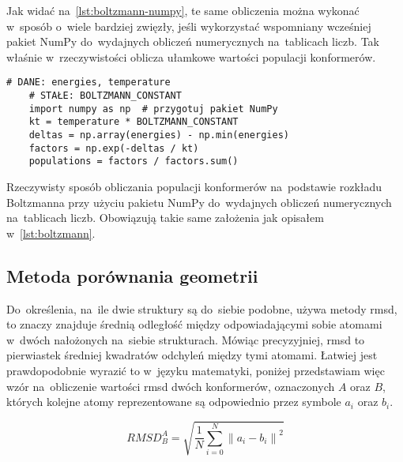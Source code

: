 Jak widać na~\cref{lst:boltzmann-numpy}, te same obliczenia można wykonać w~sposób o~wiele
  bardziej zwięzły, jeśli wykorzystać wspomniany wcześniej pakiet NumPy do~wydajnych obliczeń
  numerycznych na~tablicach liczb.
Tak właśnie \tesliper{} w~rzeczywistości oblicza ułamkowe wartości populacji konformerów.

\begin{listing}
  \begin{lstlisting}[emph={energies, temperature, BOLTZMANN_CONSTANT}]
    # DANE: energies, temperature
    # STAŁE: BOLTZMANN_CONSTANT
    import numpy as np  # przygotuj pakiet NumPy
    kt = temperature * BOLTZMANN_CONSTANT
    deltas = np.array(energies) - np.min(energies)
    factors = np.exp(-deltas / kt)
    populations = factors / factors.sum()
  \end{lstlisting}
  \caption{
    Rzeczywisty sposób obliczania populacji konformerów na~podstawie rozkładu Boltzmanna
      przy użyciu pakietu NumPy do~wydajnych obliczeń numerycznych na~tablicach liczb.
    Obowiązują takie same założenia jak opisałem w~\protect\cref{lst:boltzmann}.
  }\label{lst:boltzmann-numpy}
\end{listing}

\subsection{Metoda porównania geometrii}\label{implementation:rmsd}
Do~określenia, na~ile dwie struktury są do~siebie podobne, \tesliper{} używa metody \gls{rmsd},
  to znaczy znajduje średnią odległość między odpowiadającymi sobie atomami w~dwóch nałożonych
  na~siebie strukturach.
Mówiąc precyzyjniej, \gls{rmsd} to pierwiastek średniej kwadratów odchyleń między tymi atomami.
Łatwiej jest prawdopodobnie wyrazić to w~języku matematyki, poniżej przedstawiam więc wzór
  na~obliczenie wartości \gls{rmsd} dwóch konformerów, oznaczonych $A$ oraz $B$, których
  kolejne atomy reprezentowane są odpowiednio przez symbole $a_i$ oraz $b_i$.

\begin{equation}
  RMSD^A_B = \sqrt{\frac{1}{N}\sum\limits_{i=0}^N \left\| a_i-b_i \right\|^2}
\end{equation}

